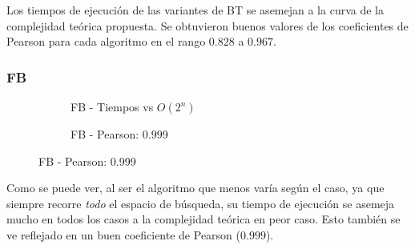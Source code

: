 Los tiempos de ejecución de las variantes de BT se asemejan a la curva de la complejidad teórica propuesta. Se obtuvieron buenos valores de los coeficientes de Pearson para cada algoritmo en el rango $0.828$ a $0.967$.

\subsubsection{FB}

\begin{figure}[H]
    \centering
    \begin{subfigure}[b]{0.48\textwidth}
        \centering
        
        \caption{FB - Tiempos vs $O(2^n)$}
    \end{subfigure}
    \hfill
    \begin{subfigure}[b]{0.42\textwidth}
        \centering
        
        \caption{FB - Pearson: 0.999}
    \end{subfigure}
\end{figure}

Como se puede ver, al ser el algoritmo que menos varía según el caso, ya que siempre recorre \textit{todo} el espacio de búsqueda, su tiempo de ejecución se asemeja mucho en todos los casos a la complejidad teórica en peor caso. Esto también se ve reflejado en un buen coeficiente de Pearson ($0.999$).
